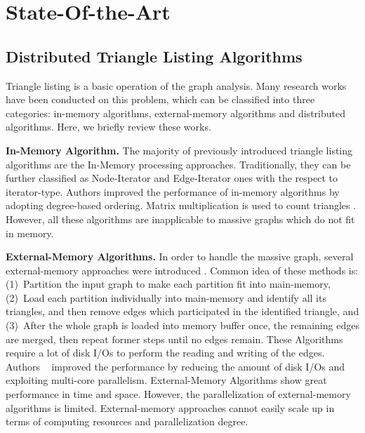 \section{State-Of-the-Art}
\label{sec:state-of-the-art}
\subsection{Distributed Triangle Listing Algorithms}
Triangle listing is a basic operation of the graph analysis. Many research works have been conducted on this problem, which can be classified into three categories: in-memory algorithms, external-memory algorithms and distributed algorithms. Here, we briefly review these works. 

\textbf{In-Memory Algorithm.} 
The majority of previously introduced triangle listing algorithms are the In-Memory processing approaches. Traditionally, they can be further classified as Node-Iterator\cite{Alon_Yuster_Zwick_1997,Batagelj_Mrvar_2001,Schank_2007} and Edge-Iterator ones\cite{
Itai_Rodeh_1978,Chiba_Nishizeki_1985} with the respect to iterator-type. Authors \cite{Itai_Rodeh_1978,Chiba_Nishizeki_1985,Schank_2007}improved the performance of in-memory algorithms by adopting degree-based ordering. 
Matrix multiplication is used to count triangles \cite{Alon_Yuster_Zwick_1997}. However, all these algorithms are inapplicable to massive graphs which do not fit in memory. 

\textbf{External-Memory Algorithms.} In order to handle the massive graph, several external-memory approaches were introduced \cite{H14,Kim_Han_Lee_Park_Yu_2014,GraphChi}. Common idea of these methods is: (1)~Partition the input graph to make each partition fit into main-memory, (2)~Load each partition individually into main-memory and identify all its triangles, and then remove edges which participated in the identified triangle, and (3)~After the whole graph is loaded into memory buffer once, the remaining edges are merged, then repeat former steps until no edges remain. These Algorithms require a lot of disk I/Os to perform the reading and writing of the edges. 
Authors ~\cite{H14,Kim_Han_Lee_Park_Yu_2014} improved the performance by reducing the amount of disk I/Os and exploiting multi-core parallelism. External-Memory Algorithms show great performance in time and space. However, the parallelization of external-memory algorithms is limited. External-memory approaches cannot easily scale up in terms of computing resources and parallelization degree.

